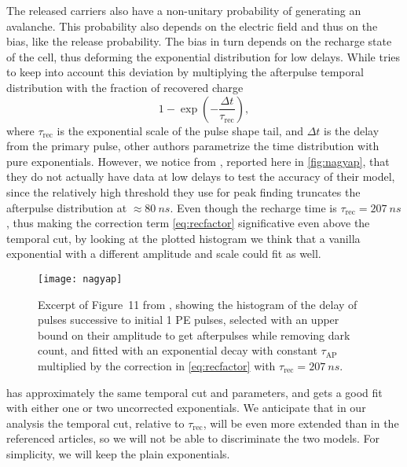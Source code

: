 The released carriers also have a non-unitary probability of generating an
avalanche. This probability also depends on the electric field and thus on the
bias, like the release probability. The bias in turn depends on the recharge
state of the cell, thus deforming the exponential distribution for low delays.
While \cite[2]{nagy2014} tries to keep into account this deviation by
multiplying the afterpulse temporal distribution with the fraction of recovered
charge
%
\begin{equation}
    1 - \exp\left(-\frac{\Delta t}{\tau_\text{rec}}\right),
    \label{eq:recfactor}
\end{equation}
%
where $\tau_\text{rec}$ is the exponential scale of the pulse shape tail, and
$\Delta t$ is the delay from the primary pulse, other authors
\cite[4]{garutti2014} parametrize the time distribution with pure exponentials.
However, we notice from \cite[p.~5~fig.~11]{nagy2014}, reported here in
\autoref{fig:nagyap}, that they do not actually have data at low delays to test
the accuracy of their model, since the relatively high threshold they use for
peak finding truncates the afterpulse distribution at $\approx\SI{80}{ns}$.
Even though the recharge time is $\tau_\text{rec} = \SI{207}{ns}$, thus making
the correction term \eqref{eq:recfactor} significative even above the temporal
cut, by looking at the plotted histogram we think that a vanilla exponential
with a different amplitude and scale could fit as well.

\begin{figure}
    
    \centering
    \texttt{[image: nagyap]}
    
    \caption{\label{fig:nagyap} Excerpt of Figure~11 from \cite{nagy2014},
    showing the histogram of the delay of pulses successive to initial 1 PE
    pulses, selected with an upper bound on their amplitude to get afterpulses
    while removing dark count, and fitted with an exponential decay with
    constant $\tau_\text{AP}$ multiplied by the correction in
    \autoref{eq:recfactor} with $\tau_\text{rec} = \SI{207}{ns}$.}
    
\end{figure}

\cite{garutti2014} has approximately the same temporal cut and parameters, and
gets a good fit with either one or two uncorrected exponentials. We anticipate
that in our analysis the temporal cut, relative to $\tau_\text{rec}$, will be
even more extended than in the referenced articles, so we will not be able to
discriminate the two models. For simplicity, we will keep the plain
exponentials.

